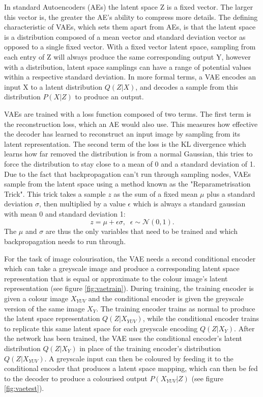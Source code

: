 \documentclass{l4proj}
\begin{document}
In standard Autoencoders (AEs) the latent space Z is a fixed vector. The larger this vector is, the greater the AE's ability to compress more details. The defining characteristic of VAEs, which sets them apart from AEs, is that the latent space is a distribution composed of a mean vector and standard deviation vector as opposed to a single fixed vector. With a fixed vector latent space, sampling from each entry of Z will always produce the same corresponding output Y, however with a distribution, latent space samplings can have a range of potential values within a respective standard deviation. In more formal terms, a VAE encodes an input X to a latent distribution $Q(Z|X)$, and decodes a sample from this distribution $P(X|Z)$ to produce an output.

VAEs are trained with a loss function composed of two terms. The first term is the reconstruction loss, which an AE would also use. This measures how effective the decoder has learned to reconstruct an input image by sampling from its latent representation. The second term of the loss is the KL divergence which learns how far removed the distribution is from a normal Gaussian, this tries to force the distribution to stay close to a mean of 0 and a standard deviation of 1. Due to the fact that backpropagation can't run through sampling nodes, VAEs sample from the latent space using a method known as the "Reparametrisation Trick". This trick takes a sample $z$ as the sum of a fixed mean $\mu$ plus a standard deviation $\sigma$, then multiplied by a value $\epsilon$ which is always a standard gaussian with mean 0 and standard deviation 1:
\begin{equation}\label{eq:reparametrisation_trick}
    z = \mu + \epsilon \sigma, \;\; \epsilon \sim \mathcal{N}(0,1).
\end{equation}
The $\mu$ and $\sigma$ are thus the only variables that need to be trained and which backpropagation needs to run through. 

For the task of image colourisation, the VAE needs a second conditional encoder which can take a greyscale image and produce a corresponding latent space representation that is equal or approximate to the colour image's latent representation (see figure \ref{fig:vaetrain}). During training, the training encoder is given a colour image $X_{YUV}$ and the conditional encoder is given the greyscale version of the same image  $X_{Y}$. The training encoder trains as normal to produce the latent space representation $Q(Z|X_{YUV})$, while the conditional encoder trains to replicate this same latent space for each greyscale encoding $Q(Z|X_{Y})$. After the network has been trained, the VAE uses the conditional encoder's latent distribution $Q(Z|X_{Y})$ in place of the training encoder's distribution $Q(Z|X_{YUV})$. A greyscale input can then be coloured by feeding it to the conditional encoder that produces a latent space mapping, which can then be fed to the decoder to produce a colourised output $P(X_{YUV}|Z)$ (see figure \ref{fig:vaetest}).
\end{document}
